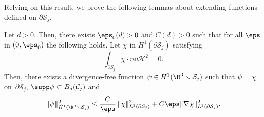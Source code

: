 Relying on this result, we prove the following lemmas about extending functions defined on $\partial \mathcal S_j$.
\begin{Lemma}
\label{Claim} Let $d > 0$. Then, there exists $\eps_0(d) >0$ and $C(d)>0$ such that for all $\eps $ in $(0, \eps_0)$ the following holds. Let $\chi$ in $H^1({\partial} \mathcal S_j)$ satisfying
\[
\int_{\partial S_j} \chi \cdot n \dd \mathcal{H}^2 = 0.\]
Then, there exists a divergence-free function $\psi \in \dot H^1(\R^3 \smallsetminus \mathcal S_j)$ such that $ \psi = \chi$ on~$ \partial \mathcal S_j$, $\supp \psi \subset B_d(\mathcal C_j)$ and
\begin{equation}
\|\psi\|^2_{\dot H^1 {(\R^3\smallsetminus\mathcal S_j)}} \leq \frac C \eps\, \| \chi\|^2_{L^2(\partial \mathcal S_j)} + C \eps \|\nabla \chi\|^2_{L^2(\partial \mathcal S_j)}.
\end{equation}
\end{Lemma}
